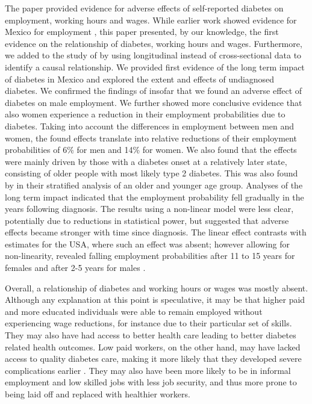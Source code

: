 \documentclass[12pt,english]{article}
\begin{document}
The paper provided evidence for adverse effects of self-reported diabetes on employment, working hours and wages. While earlier work showed evidence for Mexico for employment \parencite{Seuring2015}, this paper presented, by our knowledge, the first evidence on the relationship of diabetes, working hours and wages. Furthermore, we added to the study of \textcite{Seuring2015} by using longitudinal instead of cross-sectional data to identify a causal relationship. We provided first evidence of the long term impact of diabetes in Mexico and explored the extent and effects of undiagnosed diabetes. We confirmed the findings of \textcite{Seuring2015} insofar that we found an adverse effect of diabetes on male employment. We further showed more conclusive evidence that also women experience a reduction in their employment probabilities due to diabetes. Taking into account the differences in employment between men and women, the found effects translate into relative reductions of their employment probabilities of 6\% for men and 14\% for women. We also found that the effects were mainly driven by those with a diabetes onset at a relatively later state, consisting of older people with most likely type 2 diabetes. This was also found by \textcite{Seuring2015} in their stratified analysis of an older and younger age group. Analyses of the long term impact indicated that the employment probability fell gradually in the years following diagnosis. The results using a non-linear model were less clear, potentially due to reductions in statistical power, but suggested that adverse effects became stronger with time since diagnosis. The linear effect contrasts with estimates for the USA, where such an effect was absent; however allowing for non-linearity, revealed falling employment probabilities after 11 to 15 years for females and after 2-5 years for males \parencite{Minor2013}.

Overall, a relationship of diabetes and working hours or wages was mostly absent. Although any explanation at this point is speculative, it may be that higher paid and more educated individuals were able to remain employed without experiencing wage reductions, for instance due to their particular set of skills. They may also have had access to better health care leading to better diabetes related health outcomes. Low paid workers, on the other hand, may have lacked access to quality diabetes care, making it more likely that they developed severe complications earlier \parencite{Flores-Hernandez2015}. They may also have been more likely to be in informal employment and low skilled jobs with less job security, and thus more prone to being laid off and replaced with healthier workers.
\end{document}
